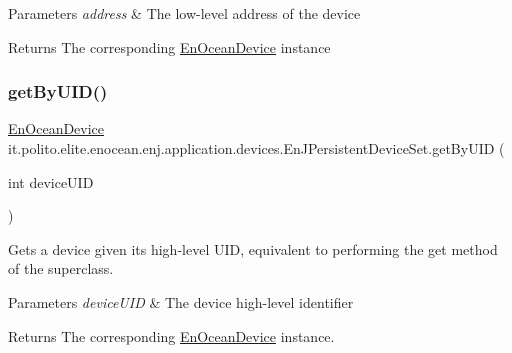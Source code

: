\begin{DoxyParams}{Parameters}
{\em address} & The low-\/level address of the device \\
\hline
\end{DoxyParams}
\begin{DoxyReturn}{Returns}
The corresponding \hyperlink{}{En\+Ocean\+Device} instance 
\end{DoxyReturn}
\hypertarget{classit_1_1polito_1_1elite_1_1enocean_1_1enj_1_1application_1_1devices_1_1_en_j_persistent_device_set_a8576d4b4bef0c29aa095e910eceddd5a}{}\label{classit_1_1polito_1_1elite_1_1enocean_1_1enj_1_1application_1_1devices_1_1_en_j_persistent_device_set_a8576d4b4bef0c29aa095e910eceddd5a} 
\subsubsection{\texorpdfstring{get\+By\+U\+I\+D()}{getByUID()}}
{\footnotesize\ttfamily \hyperlink{classit_1_1polito_1_1elite_1_1enocean_1_1enj_1_1model_1_1_en_ocean_device}{En\+Ocean\+Device} it.\+polito.\+elite.\+enocean.\+enj.\+application.\+devices.\+En\+J\+Persistent\+Device\+Set.\+get\+By\+U\+ID (\begin{DoxyParamCaption}\item[{int}]{device\+U\+ID }\end{DoxyParamCaption})}

Gets a device given its high-\/level U\+ID, equivalent to performing the get method of the superclass.


\begin{DoxyParams}{Parameters}
{\em device\+U\+ID} & The device high-\/level identifier \\
\hline
\end{DoxyParams}
\begin{DoxyReturn}{Returns}
The corresponding \hyperlink{}{En\+Ocean\+Device} instance. 
\end{DoxyReturn}
\hypertarget{classit_1_1polito_1_1elite_1_1enocean_1_1enj_1_1application_1_1devices_1_1_en_j_persistent_device_set_a900dbd6f2f27f8d190250f72525cc1f6}{}\label{classit_1_1polito_1_1elite_1_1enocean_1_1enj_1_1application_1_1devices_1_1_en_j_persistent_device_set_a900dbd6f2f27f8d190250f72525cc1f6} 
